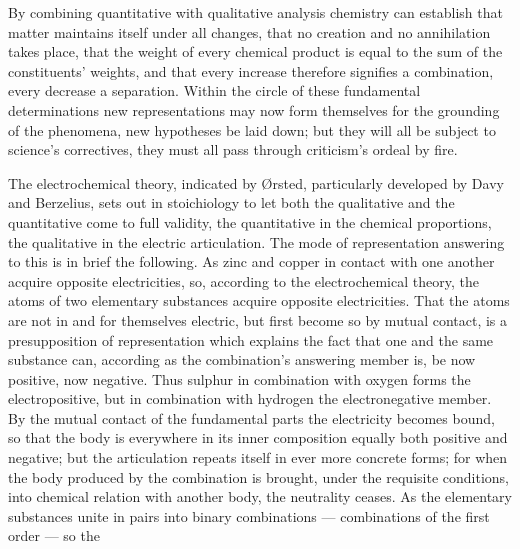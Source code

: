 \documentclass[12pt,a4paper]{book}
\begin{document}
By combining quantitative with qualitative analysis chemistry can establish that matter maintains itself under all
changes, that no creation and no annihilation takes place, that the weight of every chemical product is equal to the sum
of the constituents' weights, and that every increase therefore signifies a combination, every decrease a separation.
Within the circle of these fundamental determinations new representations may now form themselves for the grounding of
the phenomena, new hypotheses be laid down; but they will all be subject to science's correctives, they must all pass
through criticism's ordeal by fire.

The electrochemical theory, indicated by Ørsted, particularly developed by Davy and Berzelius, sets out in stoichiology
to let both the qualitative and the quantitative come to full validity, the quantitative in the chemical proportions, the
qualitative in the electric articulation. The mode of representation answering to this is in brief the following.
As zinc and copper in contact with one another acquire opposite electricities, so, according to the electrochemical
theory, the atoms of two elementary substances acquire opposite electricities. That the atoms are not in and for
themselves electric, but first become so by mutual contact, is a presupposition of representation which explains the fact
that one and the same substance can, according as the combination's answering member is, be now positive, now negative.
Thus sulphur in combination with oxygen forms the electropositive, but in combination with hydrogen the electronegative
member. By the mutual contact of the fundamental parts the electricity becomes bound, so that the body is everywhere in
its inner composition equally both positive and negative; but the articulation repeats itself in ever more concrete
forms; for when the body produced by the combination is brought, under the requisite conditions, into chemical relation
with another body, the neutrality ceases.
As the elementary substances unite in pairs into binary combinations --- combinations of the first order --- so the
\end{document}
